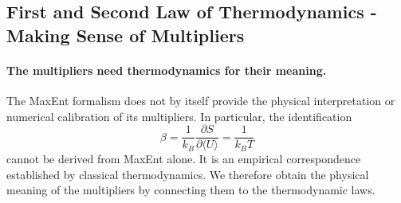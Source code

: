 \subsection{First and Second Law of Thermodynamics - Making Sense of Multipliers}
\label{sec:multipliers}

\paragraph{The multipliers need thermodynamics for their meaning.}
The MaxEnt formalism does not by itself provide the physical interpretation
or numerical calibration of its multipliers. In particular, the
identification
\begin{equation}
    \boxed{\beta=\frac{1}{k_B}\frac{\partial S}{\partial \langle U\rangle}=\frac{1}{k_BT}}
\end{equation}
cannot be derived from MaxEnt alone. It is an empirical correspondence
established by classical thermodynamics. We therefore obtain the physical
meaning of the multipliers by connecting them to the thermodynamic laws.

